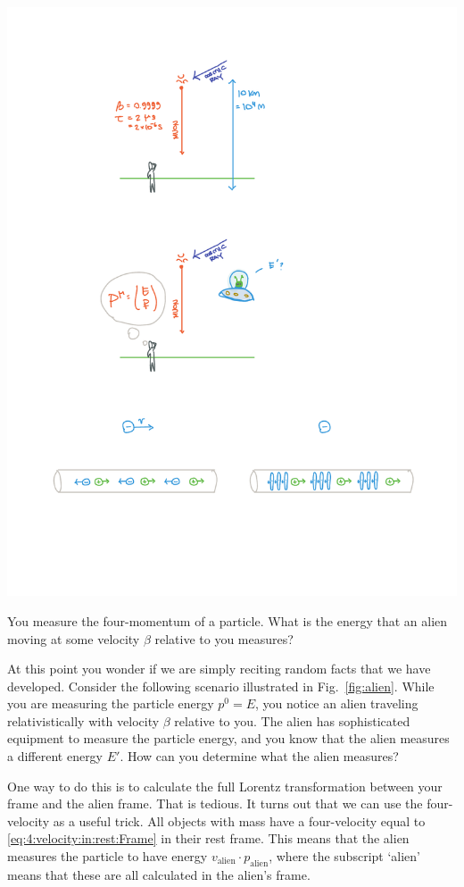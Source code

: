 \begin{marginfigure}%
    \centering
    \includegraphics[width=\textwidth]{figures/alien.pdf}
    \caption{You measure the four-momentum of a particle. What is the energy that an alien moving at some velocity $\beta$ relative to you measures?\label{fig:alien}}
\end{marginfigure}

At this point you wonder if we are simply reciting random facts that we have developed. Consider the following scenario illustrated in Fig.~\ref{fig:alien}.
%
% 
While you are measuring the particle energy $p^0 = E$, you notice an alien traveling relativistically with velocity $\beta$ relative to you. The alien has sophisticated equipment to measure the particle energy, and you know that the alien measures a different energy $E'$. How can you determine what the alien measures?

One way to do this is to calculate the full Lorentz transformation between your frame and the alien frame. That is tedious. It turns out that we can use the four-velocity as a useful trick. All objects with mass have a four-velocity equal to \eqref{eq:4:velocity:in:rest:Frame} in their rest frame. This means that the alien measures the particle to have energy $v_\text{alien}\cdot p_\text{alien}$, where the subscript `alien' means that these are all calculated in the alien's frame.

